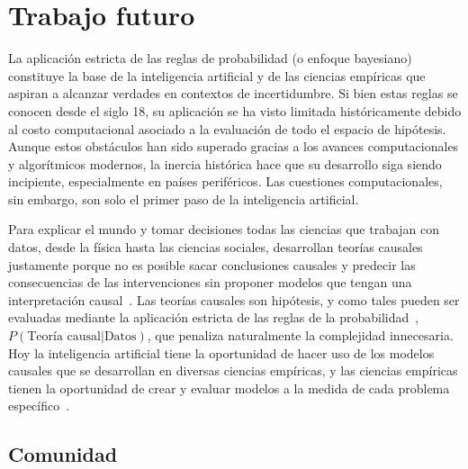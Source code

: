 \documentclass[a4paper,11pt]{book}
\theoremstyle{definition}
\begin{document}
\chapter{Trabajo futuro} \label{ch_volverAlFuturo}




La aplicaci\'on estricta de las reglas de probabilidad (o enfoque bayesiano) constituye la base de la inteligencia artificial y de las ciencias emp\'iricas que aspiran a alcanzar verdades en contextos de incertidumbre.
%
Si bien estas reglas se conocen desde el siglo 18, su aplicaci\'on se ha visto limitada hist\'oricamente debido al costo computacional asociado a la evaluaci\'on de todo el espacio de hip\'otesis.
%
Aunque estos obst\'aculos han sido superado gracias a los avances computacionales y algor\'itmicos modernos, la inercia hist\'orica hace que su desarrollo siga siendo incipiente, especialmente en pa\'ises perif\'ericos.
%
Las cuestiones computacionales, sin embargo, son solo el primer paso de la inteligencia artificial.

%

Para explicar el mundo y tomar decisiones todas las ciencias que trabajan con datos, desde la f\'isica hasta las ciencias sociales, desarrollan teor\'ias causales justamente porque no es posible sacar conclusiones causales y predecir las consecuencias de las intervenciones sin proponer modelos que tengan una interpretaci\'on causal~\cite{pearl2009-causality, peters2017-causalInference}.
%
Las teor\'ias causales son hip\'otesis, y como tales pueden ser evaluadas mediante la aplicaci\'on estricta de las reglas de la probabilidad~\cite{winn2012-causality}, $P(\text{Teor\'ia causal}|\text{Datos})$, que penaliza naturalmente la complejidad innecesaria.
%
Hoy la inteligencia artificial tiene la oportunidad de hacer uso de los modelos causales que se desarrollan en diversas ciencias emp\'iricas, y las ciencias emp\'iricas tienen la oportunidad de crear y evaluar modelos a la medida de cada problema espec\'ifico~\cite{murphy-pmlBook1,murphy-pmlBook2, Bishop2013, Bishop2006}.


\section{Comunidad}
\end{document}

